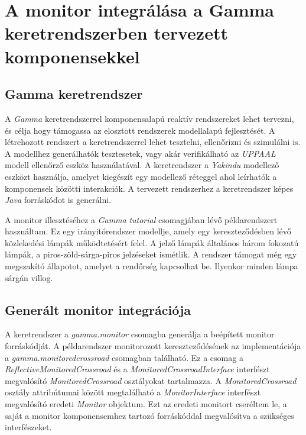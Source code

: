\chapter{A monitor integrálása a Gamma keretrendszerben tervezett komponensekkel}

\section{Gamma keretrendszer}

A \textit{Gamma} keretrendszerrel komponensalapú reaktív rendszereket lehet tervezni, és célja hogy támogassa az elosztott rendszerek modellalapú fejlesztését.
A létrehozott rendszert a keretrendszerrel lehet tesztelni, ellenőrizni és szimulálni is.
A modellhez generálhatók tesztesetek, vagy akár verifikálható az \textit{UPPAAL} modell ellenőrző eszköz használatával.
A keretrendszer a \textit{Yakindu} modellező eszközt használja, amelyet kiegészít egy modellező réteggel ahol leírhatók a komponensek közötti interakciók.
A tervezett rendszerhez a keretrendszer képes \textit{Java} forráskódot is generálni.

A monitor illesztéséhez a \textit{Gamma} \textit{tutorial} csomagjában lévő példarendszert használtam.
Ez egy irányitórendszer modellje, amely egy kereszteződésben lévő közlekedési lámpák működtetésért felel.
A jelző lámpák általános három fokozatú lámpák, a piros-zöld-sárga-piros jelzéseket ismétlik.
A rendszer támogat még egy megszakító állapotot, amelyet a rendőrség kapcsolhat be.
Ilyenkor minden lámpa sárgán villog.

\section{Generált monitor integrációja}

A keretrendszer a \textit{gamma.monitor} csomagba generálja a beépített monitor forráskódját.
A példarendszer monitorozott kereszteződésének az implementációja a \textit{gamma.monitoredcrossroad} csomagban található.
Ez a csomag a \textit{ReflectiveMonitoredCrossroad} és a \textit{MonitoredCrossroadInterface} interfészt megvalósító \textit{MonitoredCrossroad} osztályokat tartalmazza.
A \textit{MonitoredCrossroad} osztály attribútumai között megtalálható a \textit{MonitorInterface} interfészt megvalósító eredeti \textit{Monitor} objektum.
Ezt az eredeti monitort cseréltem le, a saját a monitor komponensemhez tartozó forráskóddal megvalósítva a szükséges interfészeket.


